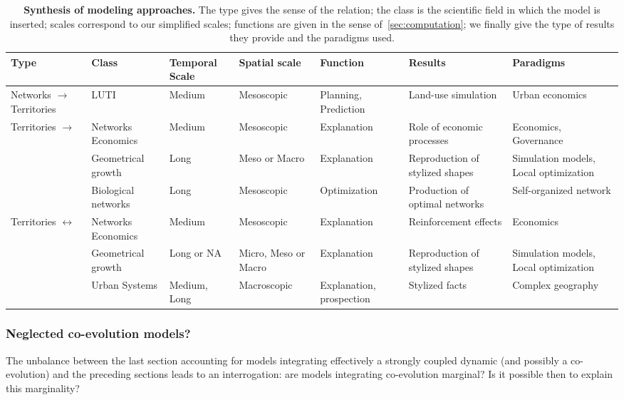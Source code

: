 \documentclass[galley]{jtlu-article-2col}
\begin{document}
\begin{table}%
\caption{\textbf{Synthesis of modeling approaches.} The type gives the sense of the relation; the class is the scientific field in which the model is inserted; scales correspond to our simplified scales; functions are given in the sense of~\ref{sec:computation}; we finally give the type of results they provide and the paradigms used.\label{tab:modelingsa:synthesis}}
\begin{tabular}{|p{2.5cm}|p{2cm}|p{2.5cm}|p{2.5cm}|p{2.1cm}|p{2.2cm}|p{2cm}|}
\hline
Type & Class & Temporal Scale & Spatial scale & Function & Results & Paradigms\\ \hline
Networks $\rightarrow$ Territories & LUTI & Medium & Mesoscopic & Planning, Prediction & Land-use simulation & Urban economics \\ \hline
\multirow{3}{*}{Territories $\rightarrow$}& Networks Economics & Medium & Mesoscopic & Explanation & Role of economic processes & Economics, Governance\\\cline{2-7}
Networks& Geometrical growth & Long & Meso or Macro & Explanation & Reproduction of stylized shapes & Simulation models, Local optimization \\\cline{2-7}
& Biological networks & Long & Mesoscopic & Optimization & Production of optimal networks & Self-organized network \\ \hline
\multirow{2}{*}{Territories $\leftrightarrow$}& Networks Economics & Medium & Mesoscopic & Explanation & Reinforcement effects & Economics\\\cline{2-7}
Networks & Geometrical growth & Long or NA & Micro, Meso or Macro & Explanation & Reproduction of stylized shapes & Simulation models, Local optimization \\\cline{2-7}
& Urban Systems & Medium, Long & Macroscopic & Explanation, prospection & Stylized facts & Complex geography\\\hline
\end{tabular}
\end{table}



\subsubsection*{Neglected co-evolution models?}

The unbalance between the last section accounting for models integrating effectively a strongly coupled dynamic (and possibly a co-evolution) and the preceding sections leads to an interrogation: are models integrating co-evolution marginal? Is it possible then to explain this marginality?
\end{document}
